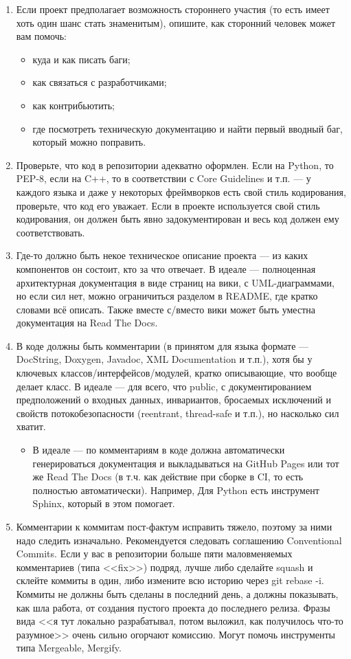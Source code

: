 \documentclass[a5paper]{article}
\begin{document}
\begin{enumerate}
    \item Если проект предполагает возможность стороннего участия (то есть имеет хоть один шанс стать знаменитым), опишите, как сторонний человек может вам помочь:
    \begin{itemize}
        \item куда и как писать баги;
        \item как связаться с разработчиками;
        \item как контрибьютить;
        \item где посмотреть техническую документацию и найти первый вводный баг, который можно поправить.
    \end{itemize}
    \item Проверьте, что код в репозитории адекватно оформлен. Если на Python, то PEP-8, если на C++, то в соответствии с Core Guidelines и т.п. --- у каждого языка и даже у некоторых фреймворков есть свой стиль кодирования, проверьте, что код его уважает. Если в проекте используется свой стиль кодирования, он должен быть явно задокументирован и весь код должен ему соответствовать.
    \item Где-то должно быть некое техническое описание проекта --- из каких компонентов он состоит, кто за что отвечает. В идеале --- полноценная архитектурная документация в виде страниц на вики, с UML-диаграммами, но если сил нет, можно ограничиться разделом в README, где кратко словами всё описать. Также вместе с/вместо вики может быть уместна документация на Read The Docs.
    \item В коде должны быть комментарии (в принятом для языка формате --- DocString, Doxygen, Javadoc, XML Documentation и т.п.), хотя бы у ключевых классов/интерфейсов/модулей, кратко описывающие, что вообще делает класс. В идеале --- для всего, что public, с документированием предположений о входных данных, инвариантов, бросаемых исключений и свойств потокобезопасности (reentrant, thread-safe и т.п.), но насколько сил хватит.
    \begin{itemize}
        \item В идеале --- по комментариям в коде должна автоматически генерироваться документация и выкладываться на GitHub Pages или тот же Read The Docs (в т.ч. как действие при сборке в CI, то есть полностью автоматически). Например, Для Python есть инструмент Sphinx, который в этом помогает.
    \end{itemize}
    \item Комментарии к коммитам пост-фактум исправить тяжело, поэтому за ними надо следить изначально. Рекомендуется следовать соглашению Conventional Commits. Если у вас в репозитории больше пяти маловменяемых комментариев (типа <<fix>>) подряд, лучше либо сделайте squash и склейте коммиты в один, либо измените всю историю через git rebase -i. Коммиты не должны быть сделаны в последний день, а должны показывать, как шла работа, от создания пустого проекта до последнего релиза. Фразы вида <<я тут локально разрабатывал, потом выложил, как получилось что-то разумное>> очень сильно огорчают комиссию. Могут помочь инструменты типа Mergeable, Mergify.
\end{enumerate}
\end{document}
